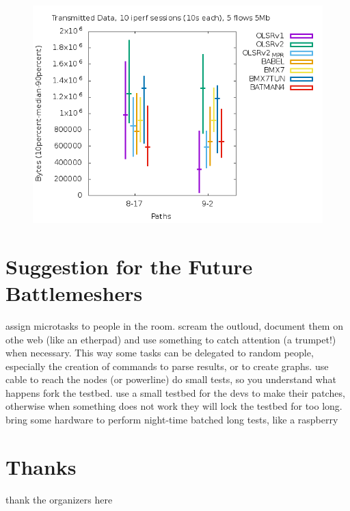 \documentclass[10pt,onecolumn]{paper}
\begin{document}
\begin{figure}
  \centering
    \includegraphics[width=.9\linewidth]{images/failure_test_iperf_10runs-IPv6-twoflow.png}
    \caption{}
  \label{fig:iperftwoflows}
\end{figure}



\section{Suggestion for the Future Battlemeshers}

\bi
\ii assign microtasks to people in the room. scream the outloud, document them on
othe web (like an etherpad) and use something to catch attention (a trumpet!)
when necessary. This way some tasks can be delegated to random people,
especially the creation of commands to parse results, or to create graphs.
\ii use cable to reach the nodes (or powerline)
\ii do small tests, so you understand what happens
\ii fork the testbed. use a small testbed for the devs to make their patches,
otherwise when something does not work they will lock the testbed for too long.
\ii bring some hardware to perform night-time batched long tests, like a
raspberry
\ei 


\section{Thanks}
thank the organizers here


\end{document}
